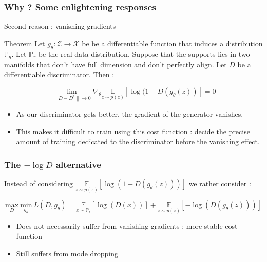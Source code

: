 \documentclass[french,9pt]{beamer}
\begin{document}
\begin{frame}
\frametitle{Why ? Some enlightening responses \cite{arjovsky_towards_2017}}

Second reason : vanishing gradients

\begin{block}{Theorem}
Let $g_{\theta} : \mathcal{Z} \rightarrow \mathcal{X}$ be be a differentiable function that induces a distribution $\mathbb{P}_{g}$. Let $\mathbb{P}_{r}$ be the real data distribution. Suppose that the supports lies in two manifolds that don’t have full dimension and don’t perfectly align. Let $D$ be a differentiable discriminator. Then :

$$\underset{\|D-D^{*}\| \rightarrow 0}{\lim} \nabla_{\theta} \underset{z\sim p(z)}{\mathbb{E}}[\log(1-D(g_{\theta}(z))]=0  $$ 

\end{block}

\pause

\begin{itemize}
\item As our discriminator gets better, the gradient of the generator vanishes.
\item This makes it difficult to train using this cost function : decide the precise amount of training dedicated to the discriminator before the vanishing effect.
\end{itemize}


\end{frame}

\begin{frame}
\frametitle{The $-\log D$ alternative}
Instead of considering $ \underset{z \sim p(z)}{\mathbb{E}}[\log(1-D(g_{\theta}(z)))]$ we rather consider :

\begin{equation}
\label{ganeeqstab}
\underset{D}{\text{max}} \ \underset{g_{\theta}}{\text{min}} \  L(D,g_{\theta}) = \underset{x \sim \mathbb{P}_{r}}{\mathbb{E}}[\log(D(x))]+ \underset{z \sim p(z)}{\mathbb{E}}[-\log(D(g_{\theta}(z)))]
\end{equation}

\begin{itemize}
\item Does not necessarily suffer from vanishing gradients : more stable cost function
\item Still suffers from mode dropping
\end{itemize}


\end{frame}
\end{document}
